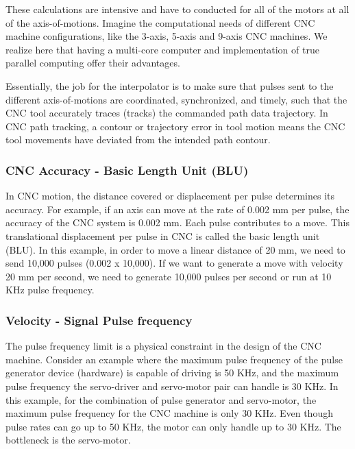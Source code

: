These calculations are intensive and have to conducted for all of the motors at all of the axis-of-motions. Imagine the computational needs of different CNC machine configurations, like the 3-axis, 5-axis and 9-axis CNC machines. We realize here that having a multi-core computer and implementation of true parallel computing offer their advantages.

\begin{tcolorbox}[colback=green!15!white,colframe=red!75!black,title=Research consideration no. 1]
\justifying
Essentially, the job for the interpolator is to make sure that pulses sent to the different axis-of-motions are coordinated, synchronized, and timely, such that the CNC tool accurately traces (tracks) the commanded path data trajectory. In CNC path tracking, a contour or trajectory error in tool motion means the CNC tool movements have deviated from the intended path contour.
\end{tcolorbox}

\subsubsection{CNC Accuracy - Basic Length Unit (BLU)}

In CNC motion, the distance covered or displacement per pulse determines its accuracy. For example, if an axis can move at the rate of 0.002 mm per pulse, the accuracy of the CNC system is 0.002 mm. Each pulse contributes to a move. This translational displacement per pulse in CNC is called the basic length unit (BLU). In this example, in order to move a linear distance of 20 mm, we need to send 10,000 pulses (0.002 x 10,000). If we want to generate a move with velocity 20 mm per second, we need to generate 10,000 pulses per second or run at 10 KHz pulse frequency. 

\subsubsection{Velocity - Signal Pulse frequency}

The pulse frequency limit is a physical constraint in the design of the CNC machine. Consider an example where the maximum pulse frequency of the pulse generator device (hardware) is capable of driving is 50 KHz, and the maximum pulse frequency the servo-driver and servo-motor pair can handle is 30 KHz. In this example, for the combination of pulse generator and servo-motor, the maximum pulse frequency for the CNC machine is only 30 KHz. Even though pulse rates can go up to 50 KHz, the motor can only handle up to 30 KHz. The bottleneck is the servo-motor. 
\vspace*{1\baselineskip}

